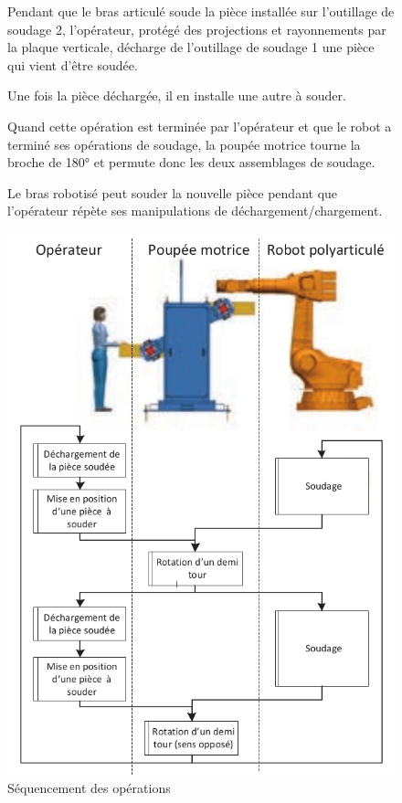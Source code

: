 \begin{figure}[!h]
\begin{minipage}{0.49\linewidth}
Pendant que le bras articulé soude la pièce installée sur l’outillage
de soudage 2, l’opérateur, protégé des projections et rayonnements par la plaque verticale, décharge de l’outillage de soudage 1 une pièce qui vient d’être soudée.

Une fois la pièce déchargée, il en installe une autre à souder.

Quand cette opération est terminée par l’opérateur et que le
robot a terminé ses opérations de soudage, la poupée motrice
tourne la broche de 180° et permute donc les deux assemblages
de soudage.

Le bras robotisé peut souder la nouvelle pièce pendant que l’opérateur répète ses manipulations de déchargement/chargement.
\end{minipage}\hfill
\begin{minipage}{0.5\linewidth}
\centering\includegraphics[width=0.95\linewidth]{img/fig03}
 \caption{Séquencement des opérations}
 \label{img03}
\end{minipage}
\end{figure}

